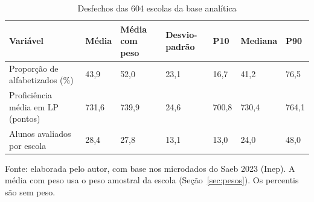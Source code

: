 \begin{table}[H]
    \centering
    \footnotesize
    \caption{Desfechos das 604 escolas da base analítica}
    \begin{tabular}{L{5.0cm}C{1.4cm}C{1.4cm}C{1.3cm}C{1.3cm}C{1.3cm}C{1.3cm}}
        \toprule
        \textbf{Variável} & \textbf{Média} & \textbf{Média com peso} & \textbf{Desvio-padrão} & \textbf{P10} & \textbf{Mediana} & \textbf{P90} \\
        \midrule
        Proporção de alfabetizados (\%) & 43,9 & 52,0 & 23,1 & 16,7 & 41,2 & 76,5 \\
        Proficiência média em LP (pontos) & 731,6 & 739,9 & 24,6 & 700,8 & 730,4 & 764,1 \\
        Alunos avaliados por escola & 28,4 & 27,8 & 13,1 & 13,0 & 24,0 & 48,0 \\
        \bottomrule
    \end{tabular}
    \vspace{0.1cm}
    \begin{flushleft}
    {\footnotesize Fonte: elaborada pelo autor, com base nos microdados do Saeb 2023 (Inep). A média com peso usa o peso amostral da escola (Seção~\ref{sec:pesos}). Os percentis são sem peso.}
    \end{flushleft}
    \label{tab:desfechos}
\end{table}
